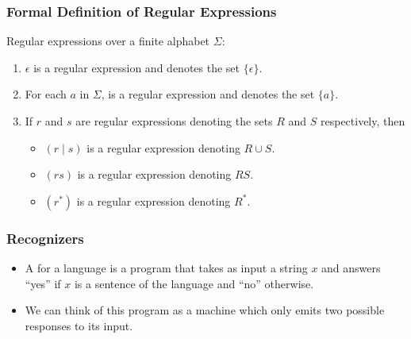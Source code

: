 \begin{frame}[fragile]
  \frametitle{Formal Definition of Regular Expressions}

Regular expressions over a finite alphabet $\Sigma$:
\pause

\begin{enumerate}[<+->]
\item $\epsilon$ is a regular expression and denotes the set
  $\{\epsilon\}$.
\item For each $a$ in $\Sigma$,  is a regular expression and
  denotes the set $\{a\}$.
\item If $r$ and $s$ are regular expressions denoting the sets $R$ and
  $S$ respectively, then 
  \begin{itemize}
    \item $(r \mid s)$ is a regular expression denoting $R \cup S$.
    \item $(rs)$ is a regular expression denoting $RS$.
    \item $(r^*)$ is a regular expression denoting $R^*$.
  \end{itemize}

\end{enumerate}
\end{frame}

\begin{frame}[fragile]
  \frametitle{Recognizers}

  \begin{itemize}[<+->]
  \item A  for a language is a program that takes as input a
string $x$ and answers ``yes'' if $x$ is a sentence of the language and
``no'' otherwise.
\item We can think of this program as a machine which only emits two possible
responses to its input.
  \end{itemize}

\end{frame}

